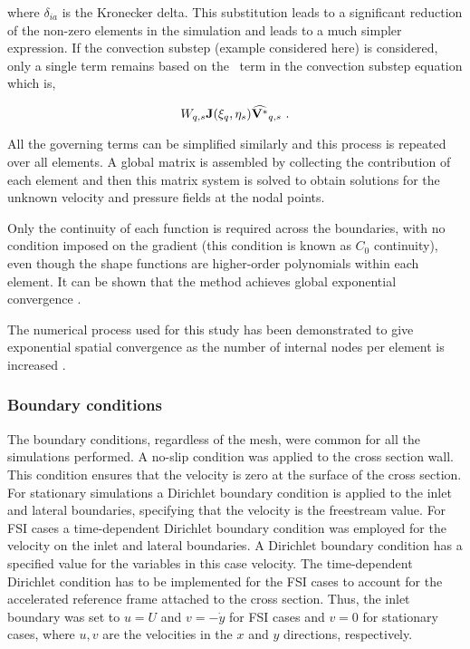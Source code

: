  where $\delta_{ia}$ is the Kronecker delta. This substitution leads to a significant reduction of the non-zero elements in the simulation and leads to a much simpler expression. If the convection substep (example considered here) is considered, only a single term remains based on the \Vint\ term in the convection substep equation which is,


 \begin{equation} \centering
 W_{q,s}\jacobian(\compone_{q},\comptwo_{s})\widehat{\Vint}_{q,s} ~.
 \end{equation}
 
 
 All the governing terms can be simplified similarly and this process is repeated over all elements. A global matrix is assembled by collecting the contribution of each element and then this matrix system is solved to obtain solutions for the unknown velocity and pressure fields at the nodal points. 
 
 Only the continuity of each function is required across the boundaries, with no condition imposed on the gradient (this condition
 is known as $C_{0}$ continuity), even though the shape functions are higher-order polynomials within each element. It can be shown that the method achieves global exponential convergence \citep{karniadakis2005}.  
 
 The numerical process used for this study has been demonstrated to give
 exponential spatial convergence as the number of internal nodes per
 element is increased \citep{Thompson1996a}.
 


\subsubsection{Boundary conditions}

The boundary conditions, regardless of the mesh, were common for all the simulations performed. A no-slip condition was applied to the cross section wall. This condition ensures that the velocity is zero at the surface of the cross section. For stationary simulations a Dirichlet boundary condition is applied to the inlet and lateral boundaries, specifying that the velocity is the freestream value. For FSI cases a time-dependent Dirichlet boundary condition was employed for the velocity on the inlet and lateral boundaries. A Dirichlet boundary condition has a specified value for the variables \citep{kreyszig2010} in this case velocity. The time-dependent Dirichlet condition has to be implemented for the FSI cases to account for the accelerated reference frame attached to the cross section. Thus, the inlet boundary was set to $u=U$ and $v=-\dot{y}$ for FSI cases and $v=0$ for stationary cases, where $u,v$ are the velocities in the $x$ and $y$ directions, respectively.

